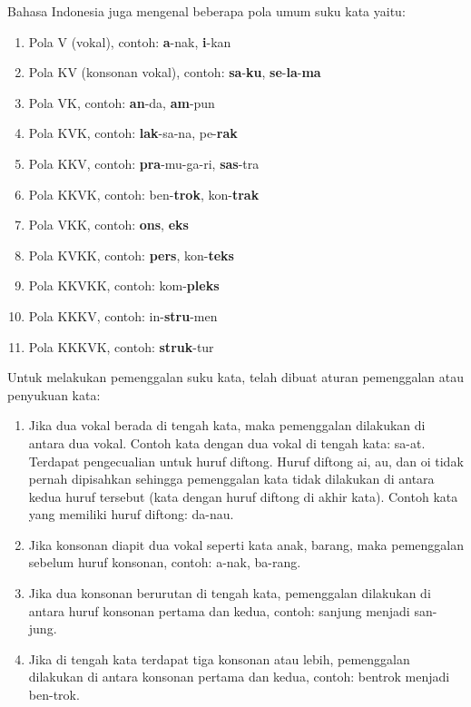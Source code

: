 Bahasa Indonesia juga mengenal beberapa pola umum suku kata yaitu:

\begin{enumerate}
	\item Pola V (vokal), contoh: \textbf{a}-nak, \textbf{i}-kan
	\item Pola KV (konsonan vokal), contoh: \textbf{sa}-\textbf{ku}, \textbf{se}-\textbf{la}-\textbf{ma}
	\item Pola VK, contoh: \textbf{an}-da, \textbf{am}-pun
	\item Pola KVK, contoh: \textbf{lak}-sa-na, pe-\textbf{rak}
	\item Pola KKV, contoh: \textbf{pra}-mu-ga-ri, \textbf{sas}-tra
	\item Pola KKVK, contoh: ben-\textbf{trok}, kon-\textbf{trak}
	\item Pola VKK, contoh: \textbf{ons}, \textbf{eks}
	\item Pola KVKK, contoh: \textbf{pers}, kon-\textbf{teks}
	\item Pola KKVKK, contoh: kom-\textbf{pleks}
	\item Pola KKKV, contoh: in-\textbf{stru}-men
	\item Pola KKKVK, contoh: \textbf{struk}-tur
\end{enumerate}

Untuk melakukan pemenggalan suku kata, telah dibuat aturan pemenggalan atau penyukuan kata:

\begin{enumerate}
	\item Jika dua vokal berada di tengah kata, maka pemenggalan dilakukan di antara dua vokal. Contoh kata dengan dua vokal di tengah kata: sa-at. Terdapat pengecualian untuk huruf diftong. Huruf diftong ai, au, dan oi tidak pernah dipisahkan sehingga pemenggalan kata tidak dilakukan di antara kedua huruf tersebut (kata dengan huruf diftong di akhir kata). Contoh kata yang memiliki huruf diftong: da-nau.
	\item Jika konsonan diapit dua vokal seperti kata anak, barang, maka pemenggalan sebelum huruf konsonan, contoh: a-nak, ba-rang.
	\item Jika dua konsonan berurutan di tengah kata, pemenggalan dilakukan di antara huruf konsonan pertama dan kedua, contoh: sanjung menjadi san-jung.
	\item Jika di tengah kata terdapat tiga konsonan atau lebih, pemenggalan dilakukan di antara konsonan pertama dan kedua, contoh: bentrok menjadi ben-trok.
\end{enumerate}

